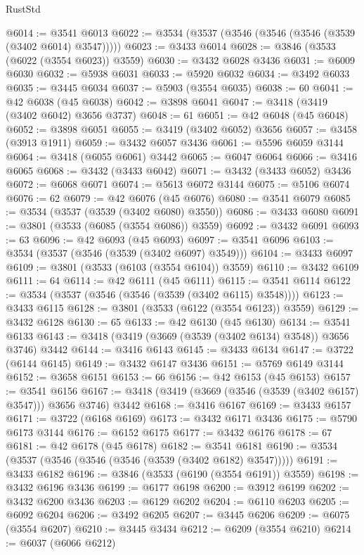 \begin{lexlean}{RustStd}
\begin{coremodule}
@6014 := @3541 @6013
@6022 := @3534 (@3537 (@3546 (@3546 (@3546 (@3539 (@3402 @6014) @3547)))))
@6023 := @3433 @6014
@6028 := @3846 (@3533 (@6022 (@3554 @6023)) @3559)
@6030 := @3432 @6028 @3436
@6031 := @6009 @6030
@6032 := @5938 @6031
@6033 := @5920 @6032
@6034 := @3492 @6033
@6035 := @3445 @6034
@6037 := @5903 (@3554 @6035)
@6038 := 60
@6041 := @42 @6038 (@45 @6038)
@6042 := @3898 @6041
@6047 := @3418 (@3419 (@3402 @6042) @3656 @3737)
@6048 := 61
@6051 := @42 @6048 (@45 @6048)
@6052 := @3898 @6051
@6055 := @3419 (@3402 @6052) @3656
@6057 := @3458 (@3913 @1911)
@6059 := @3432 @6057 @3436
@6061 := @5596 @6059 @3144
@6064 := @3418 (@6055 @6061) @3442
@6065 := @6047 @6064
@6066 := @3416 @6065
@6068 := @3432 (@3433 @6042)
@6071 := @3432 (@3433 @6052) @3436
@6072 := @6068 @6071
@6074 := @5613 @6072 @3144
@6075 := @5106 @6074
@6076 := 62
@6079 := @42 @6076 (@45 @6076)
@6080 := @3541 @6079
@6085 := @3534 (@3537 (@3539 (@3402 @6080) @3550))
@6086 := @3433 @6080
@6091 := @3801 (@3533 (@6085 (@3554 @6086)) @3559)
@6092 := @3432 @6091
@6093 := 63
@6096 := @42 @6093 (@45 @6093)
@6097 := @3541 @6096
@6103 := @3534 (@3537 (@3546 (@3539 (@3402 @6097) @3549)))
@6104 := @3433 @6097
@6109 := @3801 (@3533 (@6103 (@3554 @6104)) @3559)
@6110 := @3432 @6109
@6111 := 64
@6114 := @42 @6111 (@45 @6111)
@6115 := @3541 @6114
@6122 := @3534 (@3537 (@3546 (@3546 (@3539 (@3402 @6115) @3548))))
@6123 := @3433 @6115
@6128 := @3801 (@3533 (@6122 (@3554 @6123)) @3559)
@6129 := @3432 @6128
@6130 := 65
@6133 := @42 @6130 (@45 @6130)
@6134 := @3541 @6133
@6143 := @3418 (@3419 (@3669 (@3539 (@3402 @6134) @3548)) @3656 @3746) @3442
@6144 := @3416 @6143
@6145 := @3433 @6134
@6147 := @3722 (@6144 @6145)
@6149 := @3432 @6147 @3436
@6151 := @5769 @6149 @3144
@6152 := @3658 @6151
@6153 := 66
@6156 := @42 @6153 (@45 @6153)
@6157 := @3541 @6156
@6167 := @3418 (@3419 (@3669 (@3546 (@3539 (@3402 @6157) @3547))) @3656 @3746) @3442
@6168 := @3416 @6167
@6169 := @3433 @6157
@6171 := @3722 (@6168 @6169)
@6173 := @3432 @6171 @3436
@6175 := @5790 @6173 @3144
@6176 := @6152 @6175
@6177 := @3432 @6176
@6178 := 67
@6181 := @42 @6178 (@45 @6178)
@6182 := @3541 @6181
@6190 := @3534 (@3537 (@3546 (@3546 (@3546 (@3539 (@3402 @6182) @3547)))))
@6191 := @3433 @6182
@6196 := @3846 (@3533 (@6190 (@3554 @6191)) @3559)
@6198 := @3432 @6196 @3436
@6199 := @6177 @6198
@6200 := @3912 @6199
@6202 := @3432 @6200 @3436
@6203 := @6129 @6202
@6204 := @6110 @6203
@6205 := @6092 @6204
@6206 := @3492 @6205
@6207 := @3445 @6206
@6209 := @6075 (@3554 @6207)
@6210 := @3445 @3434
@6212 := @6209 (@3554 @6210)
@6214 := @6037 (@6066 @6212)

\end{coremodule}
\end{lexlean}

